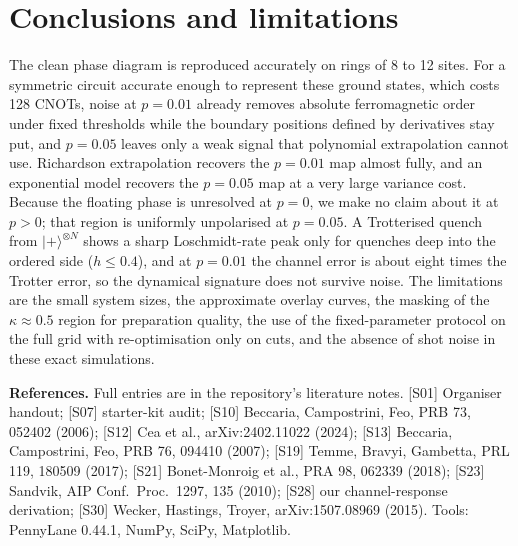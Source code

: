 \documentclass[10pt,twocolumn]{article}
\begin{document}
\section{Conclusions and limitations}
The clean phase diagram is reproduced accurately on rings of 8 to 12 sites. For a symmetric circuit accurate enough to represent these ground states, which costs 128 CNOTs, noise at $p=0.01$ already removes absolute ferromagnetic order under fixed thresholds while the boundary positions defined by derivatives stay put, and $p=0.05$ leaves only a weak signal that polynomial extrapolation cannot use. Richardson extrapolation recovers the $p=0.01$ map almost fully, and an exponential model recovers the $p=0.05$ map at a very large variance cost. Because the floating phase is unresolved at $p=0$, we make no claim about it at $p>0$; that region is uniformly unpolarised at $p=0.05$. A Trotterised quench from $|+\rangle^{\otimes N}$ shows a sharp Loschmidt-rate peak only for quenches deep into the ordered side ($h\le0.4$), and at $p=0.01$ the channel error is about eight times the Trotter error, so the dynamical signature does not survive noise. The limitations are the small system sizes, the approximate overlay curves, the masking of the $\kappa\approx0.5$ region for preparation quality, the use of the fixed-parameter protocol on the full grid with re-optimisation only on cuts, and the absence of shot noise in these exact simulations.

\vspace{0.6ex}
{\scriptsize\noindent\textbf{References.} Full entries are in the repository's literature notes.
[S01] Organiser handout; [S07] starter-kit audit; [S10] Beccaria, Campostrini, Feo, PRB 73, 052402 (2006); [S12] Cea et al., arXiv:2402.11022 (2024); [S13] Beccaria, Campostrini, Feo, PRB 76, 094410 (2007); [S19] Temme, Bravyi, Gambetta, PRL 119, 180509 (2017); [S21] Bonet-Monroig et al., PRA 98, 062339 (2018); [S23] Sandvik, AIP Conf.\ Proc.\ 1297, 135 (2010); [S28] our channel-response derivation; [S30] Wecker, Hastings, Troyer, arXiv:1507.08969 (2015). Tools: PennyLane 0.44.1, NumPy, SciPy, Matplotlib.\par}
\end{document}

